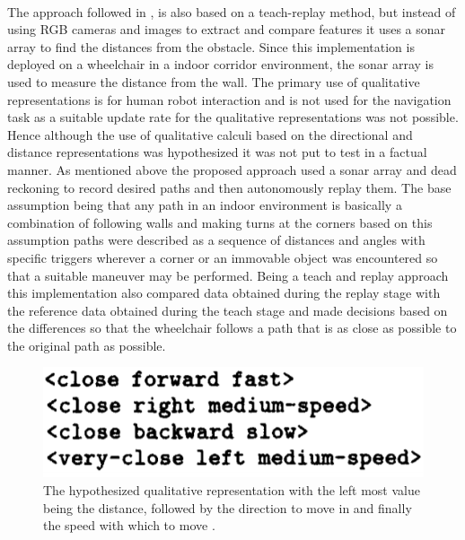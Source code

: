 	 \paragraph{}The approach followed in \cite{musto1999qualitative}, is also based on a teach-replay method, but instead of using RGB cameras and images to extract and compare features it uses a sonar array to find the distances from the obstacle. Since this implementation is deployed on a wheelchair in a indoor corridor environment, the sonar array is used to measure the distance from the wall. The primary use of qualitative representations is for human robot interaction and is not used for the navigation task as a suitable update rate for the qualitative representations was not possible. Hence although the use of qualitative calculi based on the directional and distance representations was hypothesized it was not put to test in a factual manner. As mentioned above the proposed approach used a sonar array and dead reckoning to record desired paths and then autonomously replay them. The base assumption being that any path in an indoor environment is basically a combination of following walls and making turns at the corners based on this assumption paths were described as a sequence of distances and angles with specific triggers wherever a corner or an immovable object was encountered so that a suitable maneuver may be performed. Being a teach and replay approach this implementation also compared data obtained during the replay stage with the reference data obtained during the teach stage and made decisions based on the differences so that the wheelchair follows a path that is as close as possible to the original path as possible.
	\begin{figure}[h]
		\centering
		\includegraphics[scale=0.7]{images/musto}
		\caption{The hypothesized qualitative representation with the left most value being the distance, followed by the direction to move in and finally the speed with which to move \cite{musto1999qualitative}.}
		\label{fig:musto}
	\end{figure}
	
	
